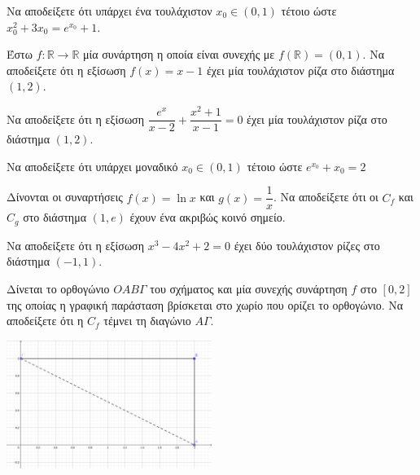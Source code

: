 \documentclass{presentation}
\begin{document}
\begin{askisi}
  Να αποδείξετε ότι υπάρχει ένα τουλάχιστον $x_0\in (0,1)$ τέτοιο ώστε $x_0^2+3x_0=e^{x_0}+1$.

\end{askisi}

\begin{askisi}
  Έστω $f:\mathbb{R}\to\mathbb{R}$ μία συνάρτηση η οποία είναι συνεχής με $f(\mathbb{R})=(0,1)$. Να αποδείξετε ότι η εξίσωση $f(x)=x-1$ έχει μία τουλάχιστον ρίζα στο διάστημα $(1,2)$.

\end{askisi}

\begin{askisi}
  Να αποδείξετε ότι η εξίσωση $\dfrac{e^x}{x-2}+\dfrac{x^2+1}{x-1}=0$ έχει μία τουλάχιστον ρίζα στο διάστημα $(1,2)$.

\end{askisi}

\begin{askisi}
  Να αποδείξετε ότι υπάρχει μοναδικό $x_0\in (0,1)$ τέτοιο ώστε $e^{x_0}+x_0=2$

\end{askisi}

\begin{askisi}
  Δίνονται οι συναρτήσεις $f(x)=\ln x$ και $g(x)=\dfrac{1}{x}$. Να αποδείξετε ότι οι $C_f$ και $C_g$ στο διάστημα $(1,e)$ έχουν ένα ακριβώς κοινό σημείο.

\end{askisi}

\begin{askisi}
  Να αποδείξετε ότι η εξίσωση $x^3-4x^2+2=0$ έχει δύο τουλάχιστον ρίζες στο διάστημα $(-1,1)$.

\end{askisi}

\begin{askisi}
  Δίνεται το ορθογώνιο $ΟΑΒΓ$ του σχήματος και μία συνεχής συνάρτηση $f$ στο $[0,2]$ της οποίας η γραφική παράσταση βρίσκεται στο χωρίο που ορίζει το ορθογώνιο. Να αποδείξετε ότι η $C_f$ τέμνει τη διαγώνιο $ΑΓ$.

  \centering
  \includegraphics[width=0.5\textwidth]{"images/Bolzano.png"}

\end{askisi}
\end{document}

